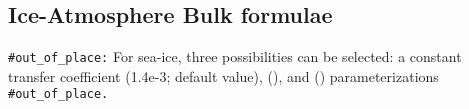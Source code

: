 \documentclass[../main/NEMO_manual]{subfiles}
\begin{document}

\subsection{Ice-Atmosphere Bulk formulae}
\label{subsec:SBC_blk_ice}


\texttt{\#out\_of\_place:}
 For sea-ice, three possibilities can be selected:
a constant transfer coefficient (1.4e-3; default
value), \citet{lupkes.gryanik.ea_JGR12} (),
and \citet{lupkes.gryanik_JGR15} () parameterizations
\texttt{\#out\_of\_place.}
\end{document}
